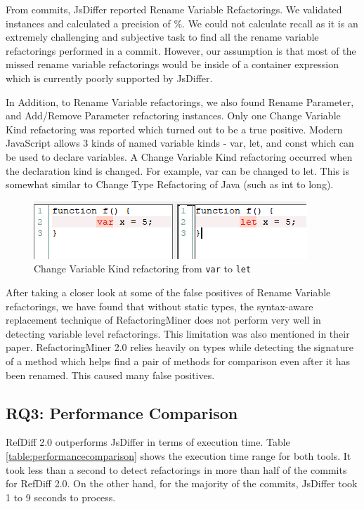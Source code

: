 \documentclass[letterpaper,12pt,onecolumn,final]{report}
\begin{document}
From \evTotalCommits{} commits, JsDiffer reported \renameVarTotalCount{} Rename Variable Refactorings. We validated \renameVarValidatedCount{} instances and calculated a precision of \renameVarPrecision{}\%.
We could not calculate recall as it is an extremely challenging and subjective task to find all the rename variable refactorings performed in a commit. However, our assumption is that most of the missed rename variable refactorings would be inside of a container expression which is currently poorly supported by JsDiffer.

In Addition, to Rename Variable refactorings, we also found Rename Parameter, and Add/Remove Parameter refactoring instances. Only one Change Variable Kind refactoring was reported which turned out to be a true positive. Modern JavaScript allows 3 kinds of named variable kinds - var, let, and const which can be used to declare variables. A Change Variable Kind refactoring occurred when the declaration kind is changed. For example, var can be changed to let. This is somewhat similar to Change Type Refactoring of Java (such as int to long).

\begin{figure}
\centering
\includegraphics[width=0.5\linewidth]{images/change_var_kind}
  \caption{Change Variable Kind refactoring from \texttt{var} to \texttt{let}}
   \label{fig:extractToggle}
\end{figure}

After taking a closer look at some of the false positives of Rename Variable refactorings, we have found that without static types, the syntax-aware replacement technique of RefactoringMiner does not perform very well in detecting variable level refactorings. This limitation was also mentioned in their paper. RefactoringMiner 2.0 relies heavily on types while detecting the signature of a method which helps find a pair of methods for comparison even after it has been renamed. This caused many false positives.


\subsection{RQ3: Performance Comparison}

RefDiff 2.0 outperforms JsDiffer in terms of execution time. Table \ref{table:performancecomparison} shows the execution time range for both tools. It took less than a second to detect refactorings in more than half of the commits for RefDiff 2.0. On the other hand, for the majority of the commits, JsDiffer took 1 to 9 seconds to process.
\end{document}
